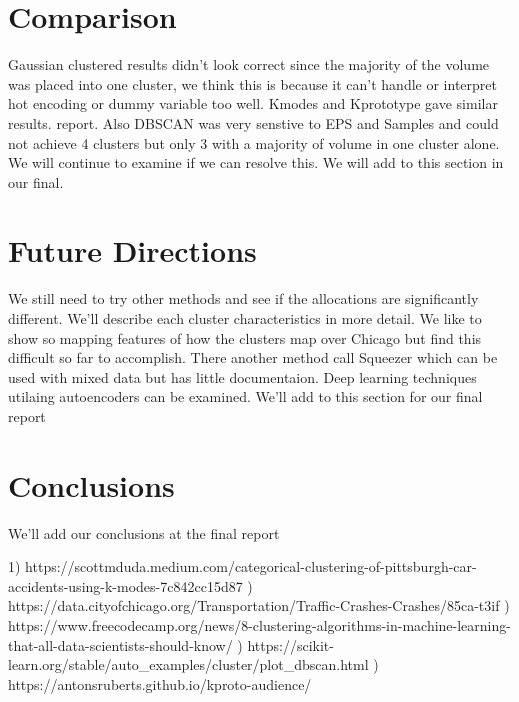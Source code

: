 \documentclass[conference]{IEEEtran}
\begin{document}
\section{Comparison}  
Gaussian clustered results didn't look correct since the majority of the volume was placed into one cluster, we think this is because it can't handle or interpret hot encoding or dummy variable too well.  Kmodes and Kprototype gave similar results. 
report.  Also DBSCAN was very senstive to EPS and Samples and could not achieve 4 clusters but only 3 with a majority of volume in one cluster alone.  We will continue to examine if we can resolve this.
We will add to this section in our final.

\section{Future Directions}
We still need to try other methods and see if the allocations are significantly different.  We'll describe each cluster characteristics in more detail.
We like to show so mapping features of how the clusters map over Chicago but find this difficult so far to accomplish.  There another method call Squeezer which can be used with mixed data but has little documentaion.  Deep learning techniques utilaing autoencoders can be examined.  We'll add to this section for our final report

\section{Conclusions}
We'll add our conclusions at the final report
 



1) https://scottmduda.medium.com/categorical-clustering-of-pittsburgh-car-accidents-using-k-modes-7c842cc15d87 ) https://data.cityofchicago.org/Transportation/Traffic-Crashes-Crashes/85ca-t3if ) https://www.freecodecamp.org/news/8-clustering-algorithms-in-machine-learning-that-all-data-scientists-should-know/  ) https://scikit-learn.org/stable/auto_examples/cluster/plot_dbscan.html ) https://antonsruberts.github.io/kproto-audience/ \linebreak
\end{document}
